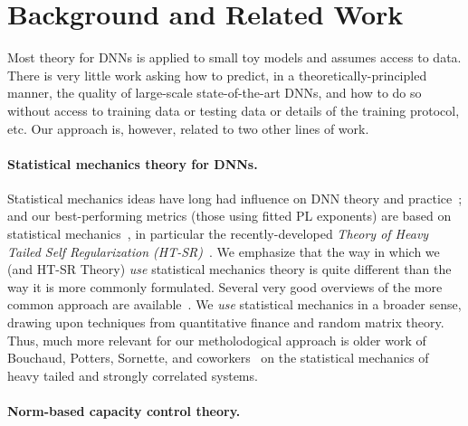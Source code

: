 \section{Background and Related Work}
\label{sxn:background}

Most theory for DNNs is applied to small toy models and assumes access to data.
There is very little work asking how to predict, in a theoretically-principled manner, the quality of large-scale state-of-the-art DNNs, and how to do so without access to training data or testing data or details of the training protocol, etc.
Our 
approach  %
is, however, 
related to 
two  %
other lines of work.


\paragraph{Statistical mechanics theory for DNNs.}

Statistical mechanics ideas have long had influence on DNN theory and practice~\cite{EB01_BOOK, MM17_TR, BKPx20}; and 
our best-performing metrics (those using fitted PL exponents) are based on statistical mechanics~\cite{MM17_TR, MM18_TR, MM19_HTSR_ICML, MM19_KDD, MM20_SDM}, in particular the recently-developed \emph{Theory of Heavy Tailed Self Regularization (HT-SR)}~\cite{MM18_TR, MM19_HTSR_ICML, MM20_SDM}.  
We emphasize that the way in which we (and HT-SR Theory) \emph{use} statistical mechanics theory is quite different than the way it is more commonly formulated.
Several very good overviews of the more common approach are available~\cite{EB01_BOOK, BKPx20}.
We \emph{use} statistical mechanics in a broader sense, drawing upon techniques from quantitative finance and random matrix theory.  %
Thus, much more relevant for our metholodogical approach is older work of Bouchaud, Potters, Sornette, and coworkers~\cite{BouchaudPotters03, SornetteBook, BP11, bun2017} on the statistical mechanics of heavy tailed and strongly correlated systems.


\paragraph{Norm-based capacity control theory.}

